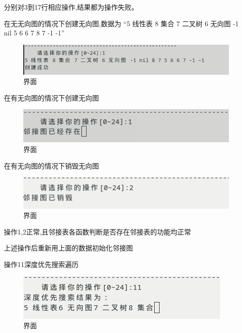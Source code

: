 \documentclass[supercite]{Experimental_Report}
\theoremstyle{definition}
\begin{document}
分别对3到17行相应操作,结果都为操作失败。

在无无向图的情况下创建无向图,数据为
“5 线性表 8 集合 7 二叉树 6 无向图 -1 nil 5 6 6 7 8 7 -1 -1”

\begin{figure}[!htb]
	\begin{center}
		\includegraphics[scale=0.60]{images/2-4.png}
		\caption{界面}
		\label{fig2-4}
		\end{center}
\end{figure}

在有无向图的情况下创建无向图

\begin{figure}[!htb]
	\begin{center}
		\includegraphics[scale=0.60]{images/2-5.png}
		\caption{界面}
		\label{fig2-5}
		\end{center}
\end{figure}

在有无向图的情况下销毁无向图

\begin{figure}[!htb]
	\begin{center}
		\includegraphics[scale=0.60]{images/2-6.png}
		\caption{界面}
		\label{fig2-6}
		\end{center}
\end{figure}

操作1,2正常,且邻接表各函数判断是否存在邻接表的功能均正常

上述操作后重新用上面的数据初始化邻接图

操作11深度优先搜索遍历

\begin{figure}[!htb]
	\begin{center}
		\includegraphics[scale=0.60]{images/2-10.png}
		\caption{界面}
		\label{fig2-7}
		\end{center}
\end{figure}
\end{document}
